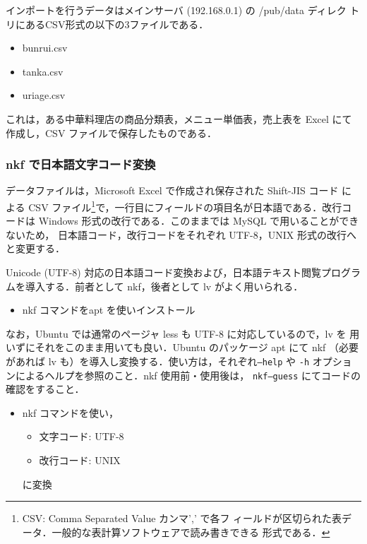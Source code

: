 インポートを行うデータはメインサーバ (192.168.0.1) の /pub/data ディレク
トリにあるCSV形式の以下の3ファイルである．
\begin{itemize}
 \item bunrui.csv
 \item tanka.csv
 \item uriage.csv
\end{itemize}

これは，ある中華料理店の商品分類表，メニュー単価表，売上表を Excel にて
作成し，CSV ファイルで保存したものである．


\subsubsection{nkf で日本語文字コード変換}

データファイルは，Microsoft Excel で作成され保存された Shift-JIS コード
による CSV ファイル\footnote{CSV: Comma Separated Value カンマ',' で各フ
ィールドが区切られた表データ．一般的な表計算ソフトウェアで読み書きできる
形式である．}で，一行目にフィールドの項目名が日本語である．改行コードは 
Windows 形式の改行である．このままでは MySQL で用いることができないため，
日本語コード，改行コードをそれぞれ UTF-8，UNIX 形式の改行へと変更する．

Unicode (UTF-8) 対応の日本語コード変換および，日本語テキスト閲覧プログラ
ムを導入する．前者として nkf，後者として lv がよく用いられる．

\begin{itemize}
    \item nkf コマンドをapt を使いインストール
\end{itemize}

なお，Ubuntu では通常のページャ less も UTF-8 に対応しているので，lv を
用いずにそれをこのまま用いても良い．Ubuntu のパッケージ apt にて nkf 
（必要があれば lv も）を導入し変換する．使い方は，それぞれ\texttt{--help} 
や \texttt{-h} オプションによるヘルプを参照のこと．nkf 使用前・使用後は，
\texttt{nkf--guess} にてコードの確認をすること．

\begin{itemize}
    \item nkf コマンドを使い，
    \begin{itemize}
        \item 文字コード: UTF-8
        \item 改行コード: UNIX
    \end{itemize}
    に変換
\end{itemize}

